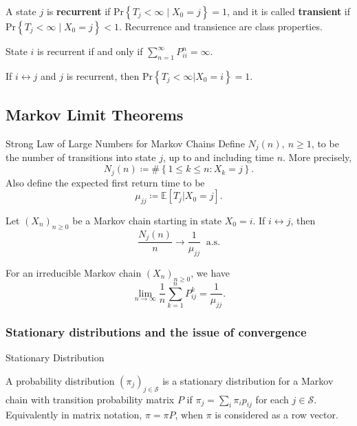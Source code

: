 \begin{idea}{}{}
    A state \( j \) is \textbf{recurrent} if \( \mathrm{Pr} \left\{ T_{j} < \infty  \mid  X _0 = j\right\}   = 1\), and it is called \textbf{transient} if \(  \mathrm{Pr} \left\{ T_{j} < \infty  \mid  X _0 = j\right\}   < 1 \). Recurrence and transience are class properties. 
\end{idea}

\begin{lem}{}{}
State \( i \) is recurrent if and only if \( \sum_{n = 1}^{\infty} P_{ii} ^n = \infty . \) 
\end{lem}

\begin{cor}{}{}
If \(i \leftrightarrow j\) and \(j\) is recurrent, then \(\mathrm{Pr} \left\{ T_{j} < \infty |X_0 = i \right\} = 1 \). 
\end{cor}

\subsection{Markov Limit Theorems}

\begin{thrm}{Strong Law of Large Numbers for Markov Chains}{}
Define \( N_{j} (n), \ n\geq 1 \), to be the number of transitions into state \( j \), up to and including time \( n \). More precisely, 
\[
    N_{j} (n)\coloneqq \# \left\{ 1\leq k\leq n: X_{k} = j \right\} . 
\]
Also define the expected first return time to be
\[
    \mu _{j j } \coloneqq \mathbb{E} [T_{j} |X_{0}= j ].
\]

Let \( (X_{n} )_{n\geq 0} \) be a Markov chain starting in state \( X_0 = i. \) If \( i \leftrightarrow j \), then
\[
\frac{    N_{j}(n)}{n} \to  \frac{1}{\mu _{j  j}} \ \text{ a.s.}
\] 
\end{thrm}

\begin{cor}{}{}
    For an irreducible Markov chain \( (X_{n} )_{n\geq 0} \),  we have
    \[
        \lim_{n \to \infty} \frac{1}{n}\sum_{k = 1}^n P_{ij}^k = \frac{1}{\mu _{j j }} . 
    \]
\end{cor}


\subsubsection{Stationary distributions and the issue of convergence}

\begin{defn}{Stationary Distribution}{}

    A probability distribution \( (\pi _{j} )_{j \in \mathcal{S}}  \) is a stationary distribution for a Markov chain with transition probability matrix \( P \) if \( \pi _{j}  = \sum_{i} \pi _{i} p _{ij}\) for each \( j \in \mathcal{S}  \). Equivalently in matrix notation, \( \pi  = \pi P\), when \( \pi    \) is considered as a row vector. 

\end{defn}

